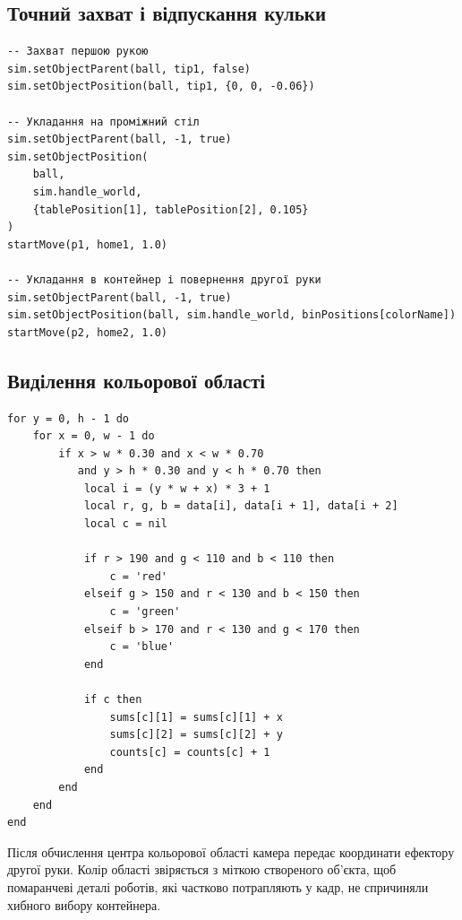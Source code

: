\documentclass[12pt,a4paper]{article}
\begin{document}
\subsection{Точний захват і відпускання кульки}

\begin{listing}[H]
\begin{verbatim}
-- Захват першою рукою
sim.setObjectParent(ball, tip1, false)
sim.setObjectPosition(ball, tip1, {0, 0, -0.06})

-- Укладання на проміжний стіл
sim.setObjectParent(ball, -1, true)
sim.setObjectPosition(
    ball,
    sim.handle_world,
    {tablePosition[1], tablePosition[2], 0.105}
)
startMove(p1, home1, 1.0)

-- Укладання в контейнер і повернення другої руки
sim.setObjectParent(ball, -1, true)
sim.setObjectPosition(ball, sim.handle_world, binPositions[colorName])
startMove(p2, home2, 1.0)
\end{verbatim}
\caption{Захват, позиціювання та повернення маніпуляторів}
\end{listing}

\subsection{Виділення кольорової області}

\begin{listing}[H]
\begin{verbatim}
for y = 0, h - 1 do
    for x = 0, w - 1 do
        if x > w * 0.30 and x < w * 0.70
           and y > h * 0.30 and y < h * 0.70 then
            local i = (y * w + x) * 3 + 1
            local r, g, b = data[i], data[i + 1], data[i + 2]
            local c = nil

            if r > 190 and g < 110 and b < 110 then
                c = 'red'
            elseif g > 150 and r < 130 and b < 150 then
                c = 'green'
            elseif b > 170 and r < 130 and g < 170 then
                c = 'blue'
            end

            if c then
                sums[c][1] = sums[c][1] + x
                sums[c][2] = sums[c][2] + y
                counts[c] = counts[c] + 1
            end
        end
    end
end
\end{verbatim}
\caption{Порогова класифікація пікселів зображення}
\end{listing}

Після обчислення центра кольорової області камера передає координати
ефектору другої руки. Колір області звіряється з міткою створеного об'єкта,
щоб помаранчеві деталі роботів, які частково потрапляють у кадр, не
спричиняли хибного вибору контейнера.
\end{document}
